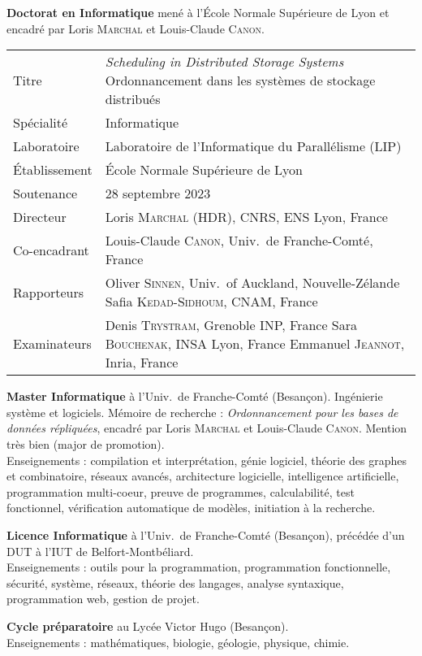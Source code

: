 \documentclass[12pt]{article}
\newcommand{\cvitem}[2]{\item[#1] #2}
\newcounter{cvitems}
\begin{document}
\begin{cvitems}
    \cvitem{2020--2023}{\textbf{Doctorat en Informatique} mené à l'École Normale Supérieure de Lyon
    et encadré par Loris \textsc{Marchal} et Louis-Claude \textsc{Canon}.

    \renewcommand{\arraystretch}{1.4}
    \begin{tabularx}{\linewidth}{@{}lX@{}}
        Titre         & \emph{\foreignlanguage{english}{Scheduling in Distributed Storage Systems}} \newline
                        Ordonnancement dans les systèmes de stockage distribués \tabularnewline
        Spécialité    & Informatique \tabularnewline
        Laboratoire   & Laboratoire de l'Informatique du Parallélisme (LIP) \tabularnewline
        Établissement & École Normale Supérieure de Lyon \tabularnewline
        Soutenance    & 28 septembre 2023 \tabularnewline
        Directeur     & Loris \textsc{Marchal} (HDR), CNRS, ENS Lyon, France \tabularnewline
        Co-encadrant  & Louis-Claude \textsc{Canon}, Univ.\ de Franche-Comté, France \tabularnewline
        Rapporteurs   & Oliver \textsc{Sinnen}, Univ.\ of Auckland, Nouvelle-Zélande \newline
                        Safia \textsc{Kedad-Sidhoum}, CNAM, France \tabularnewline
        Examinateurs  & Denis \textsc{Trystram}, Grenoble INP, France \newline
                        Sara \textsc{Bouchenak}, INSA Lyon, France \newline
                        Emmanuel \textsc{Jeannot}, Inria, France \tabularnewline
    \end{tabularx}}

    \cvitem{2018--2020}{\textbf{Master Informatique} à l'Univ.\ de Franche-Comté (Besançon).  
    Ingénierie système et logiciels.  
    Mémoire de recherche : \emph{Ordonnancement pour les bases de données répliquées}, encadré par
    Loris \textsc{Marchal} et Louis-Claude \textsc{Canon}.  
    Mention très bien (major de promotion). \\[4pt]
    Enseignements : compilation et interprétation, génie logiciel, théorie des graphes et
    combinatoire, réseaux avancés, architecture logicielle, intelligence artificielle,
    programmation multi-coeur, preuve de programmes, calculabilité, test fonctionnel, vérification
    automatique de modèles, initiation à la recherche.}

    \cvitem{2015--2018}{\textbf{Licence Informatique} à l'Univ.\ de Franche-Comté (Besançon),
    précédée d'un DUT à l'IUT de Belfort-Montbéliard. \\[4pt]
    Enseignements : outils pour la programmation, programmation fonctionnelle, sécurité, système,
    réseaux, théorie des langages, analyse syntaxique, programmation web, gestion de projet.}

    \cvitem{2013-2015}{\textbf{Cycle préparatoire} au Lycée Victor Hugo (Besançon). \\[4pt]
    Enseignements : mathématiques, biologie, géologie, physique, chimie.}
\end{cvitems}
\end{document}
